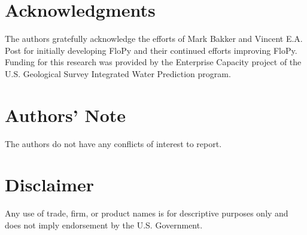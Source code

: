 \documentclass[12pt, oneside]{article}  	%
\begin{document}
\section*{Acknowledgments}
The authors gratefully acknowledge the efforts of Mark Bakker and Vincent E.A. Post for initially developing FloPy and their continued efforts improving FloPy. Funding for this research was provided by the Enterprise Capacity project of the U.S. Geological Survey Integrated Water Prediction program.

\section*{Authors' Note}
The authors do not have any conflicts of interest to report.

\section*{Disclaimer}
Any use of trade, firm, or product names is for descriptive purposes only and does not imply endorsement by the U.S. Government.




\begingroup
	\renewcommand{\listfigurename}{Figure captions}
	\listoffigures
\endgroup
\end{document}
